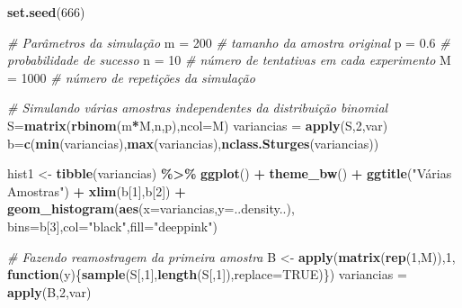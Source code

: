 \documentclass[
]{book}
\newenvironment{Shaded}{\begin{snugshade}}{\end{snugshade}}
\newcommand{\AttributeTok}[1]{\textcolor[rgb]{0.13,0.29,0.53}{#1}}
\newcommand{\CommentTok}[1]{\textcolor[rgb]{0.56,0.35,0.01}{\textit{#1}}}
\newcommand{\ConstantTok}[1]{\textcolor[rgb]{0.56,0.35,0.01}{#1}}
\newcommand{\ControlFlowTok}[1]{\textcolor[rgb]{0.13,0.29,0.53}{\textbf{#1}}}
\newcommand{\DecValTok}[1]{\textcolor[rgb]{0.00,0.00,0.81}{#1}}
\newcommand{\FloatTok}[1]{\textcolor[rgb]{0.00,0.00,0.81}{#1}}
\newcommand{\FunctionTok}[1]{\textcolor[rgb]{0.13,0.29,0.53}{\textbf{#1}}}
\newcommand{\NormalTok}[1]{#1}
\newcommand{\OtherTok}[1]{\textcolor[rgb]{0.56,0.35,0.01}{#1}}
\newcommand{\SpecialCharTok}[1]{\textcolor[rgb]{0.81,0.36,0.00}{\textbf{#1}}}
\newcommand{\StringTok}[1]{\textcolor[rgb]{0.31,0.60,0.02}{#1}}
\begin{document}
\begin{Shaded}
\begin{Highlighting}[]
\FunctionTok{set.seed}\NormalTok{(}\DecValTok{666}\NormalTok{) }

\CommentTok{\# Parâmetros da simulação}
\NormalTok{m }\OtherTok{=} \DecValTok{200}     \CommentTok{\# tamanho da amostra original}
\NormalTok{p }\OtherTok{=} \FloatTok{0.6}     \CommentTok{\# probabilidade de sucesso }
\NormalTok{n }\OtherTok{=} \DecValTok{10}      \CommentTok{\# número de tentativas em cada experimento }
\NormalTok{M }\OtherTok{=} \DecValTok{1000}    \CommentTok{\# número de repetições da simulação}

\CommentTok{\# Simulando várias amostras independentes da distribuição binomial}
\NormalTok{S}\OtherTok{=}\FunctionTok{matrix}\NormalTok{(}\FunctionTok{rbinom}\NormalTok{(m}\SpecialCharTok{*}\NormalTok{M,n,p),}\AttributeTok{ncol=}\NormalTok{M)}
\NormalTok{variancias }\OtherTok{=} \FunctionTok{apply}\NormalTok{(S,}\DecValTok{2}\NormalTok{,var)}
\NormalTok{b}\OtherTok{=}\FunctionTok{c}\NormalTok{(}\FunctionTok{min}\NormalTok{(variancias),}\FunctionTok{max}\NormalTok{(variancias),}\FunctionTok{nclass.Sturges}\NormalTok{(variancias))}

\NormalTok{hist1 }\OtherTok{\textless{}{-}} \FunctionTok{tibble}\NormalTok{(variancias) }\SpecialCharTok{\%\textgreater{}\%} \FunctionTok{ggplot}\NormalTok{() }\SpecialCharTok{+} \FunctionTok{theme\_bw}\NormalTok{() }\SpecialCharTok{+}
  \FunctionTok{ggtitle}\NormalTok{(}\StringTok{"Várias Amostras"}\NormalTok{) }\SpecialCharTok{+}  \FunctionTok{xlim}\NormalTok{(b[}\DecValTok{1}\NormalTok{],b[}\DecValTok{2}\NormalTok{]) }\SpecialCharTok{+}
  \FunctionTok{geom\_histogram}\NormalTok{(}\FunctionTok{aes}\NormalTok{(}\AttributeTok{x=}\NormalTok{variancias,}\AttributeTok{y=}\NormalTok{..density..),}
      \AttributeTok{bins=}\NormalTok{b[}\DecValTok{3}\NormalTok{],}\AttributeTok{col=}\StringTok{"black"}\NormalTok{,}\AttributeTok{fill=}\StringTok{"deeppink"}\NormalTok{)}

\CommentTok{\# Fazendo reamostragem da primeira amostra}
\NormalTok{B }\OtherTok{\textless{}{-}} \FunctionTok{apply}\NormalTok{(}\FunctionTok{matrix}\NormalTok{(}\FunctionTok{rep}\NormalTok{(}\DecValTok{1}\NormalTok{,M)),}\DecValTok{1}\NormalTok{,}
           \ControlFlowTok{function}\NormalTok{(y)\{}\FunctionTok{sample}\NormalTok{(S[,}\DecValTok{1}\NormalTok{],}\FunctionTok{length}\NormalTok{(S[,}\DecValTok{1}\NormalTok{]),}\AttributeTok{replace=}\ConstantTok{TRUE}\NormalTok{)\})}
\NormalTok{variancias }\OtherTok{=} \FunctionTok{apply}\NormalTok{(B,}\DecValTok{2}\NormalTok{,var)}


\end{Highlighting}
\end{Shaded}
\end{document}
